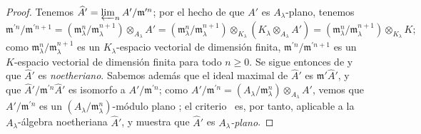 \documentclass[oneside]{amsart}
\renewcommand{\geq}{\geqslant}
\begin{document}
\begin{proof}
Tenemos $\widehat{A}'=\varprojlim_n A'/\mathfrak{m}^{\prime n}$;
por el hecho de que $A'$ es $A_\lambda$-plano, tenemos
\[
  \mathfrak{m}^{\prime n}/\mathfrak{m}^{\prime n+1}=(\mathfrak{m}_\lambda^{n}/\mathfrak{m}_\lambda^{n+1})\otimes_{A_\lambda}A'=(\mathfrak{m}_\lambda^{n}/\mathfrak{m}_\lambda^{n+1})\otimes_{K_\lambda}(K_\lambda\otimes_{A_\lambda}A')=(\mathfrak{m}_\lambda^{n}/\mathfrak{m}_\lambda^{n+1})\otimes_{K_\lambda}K;
\]
como $\mathfrak{m}_\lambda^{n}/\mathfrak{m}_\lambda^{n+1}$ es un $K_\lambda$-espacio vectorial de dimensión finita, $\mathfrak{m}^{\prime n}/\mathfrak{m}^{\prime n+1}$ es un $K$-espacio vectorial de dimensión finita para todo $n\geq 0$.
Se sigue entonces de  y  que $\widehat{A}'$ es \emph{noetheriano}.
Sabemos además que el ideal maximal de $\widehat{A}'$ es $\mathfrak{m}'\widehat{A}'$, y que $\widehat{A}'/\mathfrak{m}^{\prime n}\widehat{A}'$ es isomorfo a $A'/\mathfrak{m}^{\prime n}$;
como $A'/\mathfrak{m}^{\prime n}=(A_\lambda/\mathfrak{m}_\lambda^n)\otimes_{A_\lambda}A'$, vemos que $A'/\mathfrak{m}^{\prime n}$ es un $(A_\lambda/\mathfrak{m}_\lambda^n)$-módulo plano ;
el criterio~ es, por tanto, aplicable a la $A_\lambda$-álgebra noetheriana $\widehat{A}'$, y muestra que $\widehat{A}'$ es \emph{$A_\lambda$-plano}.
\end{proof}
\end{document}
